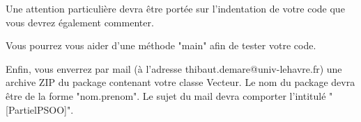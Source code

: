 \documentclass[a4paper,11pt]{article}
\begin{document}
Une attention particulière devra être portée sur l'indentation de votre code que vous devrez également commenter.

Vous pourrez vous aider d'une méthode "main" afin de tester votre code.

Enfin, vous enverrez par mail (à l'adresse thibaut.demare@univ-lehavre.fr) une archive ZIP du package contenant votre classe Vecteur. Le nom du package devra être de la forme "nom.prenom". Le sujet du mail devra comporter l'intitulé "[PartielPSOO]".



  
  
  
  
  
  
\end{document}
